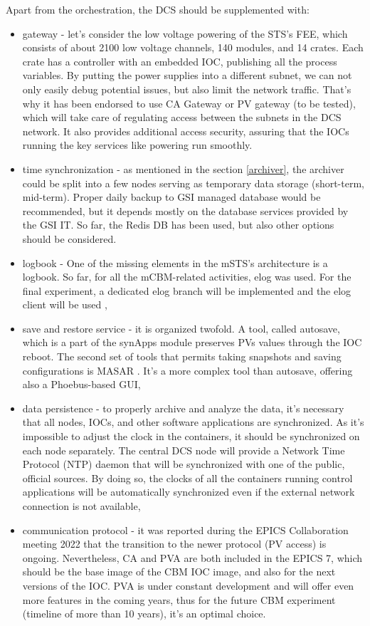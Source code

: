  Apart from the orchestration, the \gls{DCS} should be supplemented with:
 \begin{itemize}
      \item gateway - let's consider the low voltage powering of the STS's \gls{FEE}, which consists of about 2100 low voltage channels, 140 modules, and 14 crates. Each crate has a controller with an embedded \gls{IOC}, publishing all the process variables. By putting the power supplies into a different subnet, we can not only easily debug potential issues, but also limit the network traffic. That's why it has been endorsed to use CA Gateway \cite{gateway} or \gls{PV} gateway (to be tested), which will take care of regulating access between the subnets in the DCS network. It also provides additional access security, assuring that the \glspl{IOC} running the key services like powering run smoothly.
     \item time synchronization - as mentioned in the section \ref{archiver}, the archiver could be split into a few nodes serving as temporary data storage (short-term, mid-term). Proper daily backup to GSI managed database would be recommended, but it depends mostly on the database services provided by the GSI IT. So far, the Redis DB has been used, but also other options should be considered.       
     \item logbook - One of the missing elements in the \gls{mSTS}'s architecture is a logbook. So far, for all the mCBM-related activities, elog \cite{elog} was used. For the final experiment, a dedicated elog branch will be implemented and the elog client will be used \cite{elog_client},
     \item save and restore service - it is organized twofold. A tool, called autosave, which is a part of the synApps module \cite{autosave} preserves \glspl{PV} values through the \gls{IOC} reboot. The second set of tools that permits taking snapshots and saving configurations is MASAR \cite{masar}. It's a more complex tool than autosave, offering also a Phoebus-based \gls{GUI},
     \item data persistence - to properly archive and analyze the data, it's necessary that all nodes, \glspl{IOC}, and other software applications are synchronized. As it's impossible to adjust the clock in the containers, it should be synchronized on each node separately. The central \gls{DCS} node will provide a Network Time Protocol (\gls{NTP}) daemon that will be synchronized with one of the public, official sources.  By doing so, the clocks of all the containers running control applications will be automatically synchronized even if the external network connection is not available,
     \item communication protocol - it was reported during the EPICS Collaboration meeting 2022 \cite{epics_2022} that the transition to the newer protocol (PV access) is ongoing. Nevertheless, CA and PVA are both included in the EPICS 7, which should be the base image of the \gls{CBM} \gls{IOC} image, and also for the next versions of the \gls{IOC}. PVA is under constant development and will offer even more features in the coming years, thus for the future CBM experiment (timeline of more than 10 years), it's an optimal choice. 
 \end{itemize}


